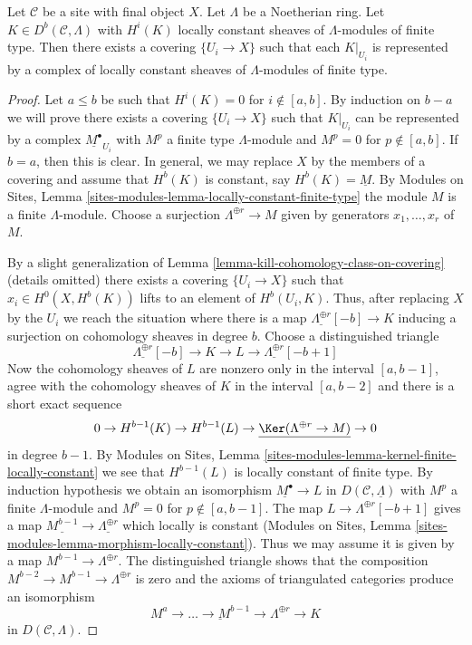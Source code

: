 \begin{lemma}
\label{lemma-locally-constant}
Let $\mathcal{C}$ be a site with final object $X$.
Let $\Lambda$ be a Noetherian ring.
Let $K \in D^b(\mathcal{C}, \Lambda)$
with $H^i(K)$ locally constant sheaves of $\Lambda$-modules
of finite type. Then there exists a covering $\{U_i \to X\}$
such that each $K|_{U_i}$ is represented by
a complex of locally constant sheaves of $\Lambda$-modules
of finite type.
\end{lemma}

\begin{proof}
Let $a \leq b$ be such that $H^i(K) = 0$ for $i \not \in [a, b]$.
By induction on $b - a$ we will prove there exists a covering
$\{U_i \to X\}$ such that $K|_{U_i}$ can be represented by a complex
$\underline{M^\bullet}_{U_i}$ with $M^p$ a finite type $\Lambda$-module
and $M^p = 0$ for $p \not \in [a, b]$. If $b = a$, then
this is clear. In general, we may replace $X$ by the members
of a covering and assume that $H^b(K)$ is constant, say
$H^b(K) = \underline{M}$. By Modules on Sites, Lemma
\ref{sites-modules-lemma-locally-constant-finite-type}
the module $M$ is a finite $\Lambda$-module. Choose a surjection
$\Lambda^{\oplus r} \to M$ given by generators $x_1, \ldots, x_r$
of $M$.

\medskip\noindent
By a slight generalization of
Lemma \ref{lemma-kill-cohomology-class-on-covering} (details omitted)
there exists a covering $\{U_i \to X\}$ such that $x_i \in H^0(X, H^b(K))$
lifts to an element of $H^b(U_i, K)$. Thus, after replacing $X$ by the
$U_i$ we reach the situation where there is a map
$\underline{\Lambda^{\oplus r}}[-b] \to K$
inducing a surjection on cohomology sheaves in degree $b$.
Choose a distinguished triangle
$$
\underline{\Lambda^{\oplus r}}[-b] \to K \to L \to
\underline{\Lambda^{\oplus r}}[-b + 1]
$$
Now the cohomology sheaves of $L$ are nonzero only in the interval
$[a, b - 1]$, agree with the cohomology sheaves of $K$ in the interval
$[a, b - 2]$ and there is a short exact sequence
$$
0 \to H^{b - 1}(K) \to H^{b - 1}(L) \to
\underline{\Ker(\Lambda^{\oplus r} \to M)} \to 0
$$
in degree $b - 1$. By
Modules on Sites, Lemma
\ref{sites-modules-lemma-kernel-finite-locally-constant}
we see that $H^{b - 1}(L)$ is locally constant of finite type.
By induction hypothesis we obtain an isomorphism
$\underline{M^\bullet} \to L$ in $D(\mathcal{C}, \underline{\Lambda})$
with $M^p$ a finite $\Lambda$-module and $M^p = 0$ for
$p \not \in [a, b - 1]$. The map $L \to \Lambda^{\oplus r}[-b + 1]$
gives a map $\underline{M^{b - 1}} \to \underline{\Lambda^{\oplus r}}$
which locally is constant
(Modules on Sites, Lemma
\ref{sites-modules-lemma-morphism-locally-constant}).
Thus we may assume it is given by a map $M^{b - 1} \to \Lambda^{\oplus r}$.
The distinguished triangle shows that the composition
$M^{b - 2} \to M^{b - 1} \to \Lambda^{\oplus r}$ is zero
and the axioms of triangulated categories produce an isomorphism
$$
\underline{M^a \to \ldots \to M^{b - 1} \to \Lambda^{\oplus r}}
\longrightarrow K
$$
in $D(\mathcal{C}, \Lambda)$.
\end{proof}

